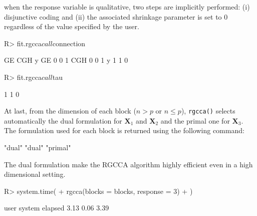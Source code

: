 \documentclass[
]{jss}
\begin{document}
\normalsize

when the response variable is qualitative, two steps are implicitly
performed: (i) disjunctive coding and (ii) the associated shrinkage
parameter is set to \(0\) regardless of the value specified by the user.

\footnotesize

\begin{CodeChunk}
\begin{CodeInput}
R> fit.rgcca$call$connection
\end{CodeInput}
\begin{CodeOutput}
    GE CGH y
GE   0   0 1
CGH  0   0 1
y    1   1 0
\end{CodeOutput}
\end{CodeChunk}

\normalsize

\footnotesize

\begin{CodeChunk}
\begin{CodeInput}
R> fit.rgcca$call$tau
\end{CodeInput}
\begin{CodeOutput}
[1] 1 1 0
\end{CodeOutput}
\end{CodeChunk}

\normalsize

At last, from the dimension of each block (\(n>p\) or \(n\leq p\)),
\texttt{rgcca()} selects automatically the dual formulation for
\(\mathbf{X}_1\) and \(\mathbf{X}_2\) and the primal one for
\(\mathbf{X}_3\). The formulation used for each block is returned using
the following command:

\footnotesize

\begin{CodeChunk}
\begin{CodeOutput}
[1] "dual"   "dual"   "primal"
\end{CodeOutput}
\end{CodeChunk}

\normalsize

The dual formulation make the RGCCA algorithm highly efficient even in a
high dimensional setting.

\footnotesize

\begin{CodeChunk}
\begin{CodeInput}
R> system.time(
+   rgcca(blocks = blocks, response = 3)
+ )
\end{CodeInput}
\begin{CodeOutput}
   user  system elapsed 
   3.13    0.06    3.39 
\end{CodeOutput}
\end{CodeChunk}
\end{document}

